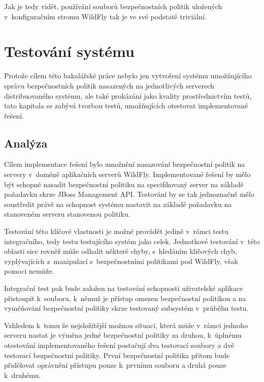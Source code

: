 Jak je tedy vidět, používání souborů bezpečnostních politik uložených v~konfiguračním stromu WildFly tak je ve své podstatě triviální.

\chapter{Testování systému} \label{testovani}

Protože cílem této bakalářské práce nebylo jen vytvoření systému umožňujícího správu bezpečnostních politik nasazených na jednotlivých serverech distribuovaného systému, ale také prokázání jako kvality prostřednictvím testů, tato kapitola se zabývá tvorbou testů, umožňujících otestovat implementované řešení.

\section{Analýza} %

Cílem implementace řešení bylo umožnění nasazování bezpečnostní politik na servery v~doméně aplikačních serverů WildFly.
Implementované řešení by mělo být schopné nasadit bezpečnostní politiku na specifikovaný server na základě požadavku skrze JBoss Management API.
Testování by se tak jednoznačně mělo soustředit právě na schopnost systému nastavit na základě požadavku na stanoveném serveru stanovenou politiku.

Testování této klíčové vlastnosti je možné provádět jedině v~rámci testu integračního, tedy testu testujícího systém jako celek.
Jednotkové testování v~této oblasti sice rovněž může odhalit některé chyby, s~hledáním klíčových chyb, vyplývajících z~manipulací s~bezpečnostními politikami pod WildFly, však pomoci nemůže.

Integrační test pak bude založen na testování schopnosti uživatelské aplikace přistoupit k~souboru, k~němuž je přístup omezen bezpečnostní politikou a na vyměňování bezpečnostní politiky skrze testovaný subsystém v~průběhu testu.

Vzhledem k~tomu že nejsložitější možnou situací, která může v~rámci jednoho serveru nastat je výměna jedné bezpečnostní politiky za druhou,
k~úplnému otestování implementovaného řešení postačují dva testovací soubory a dvě testovací bezpečnostní politiky.
První bezpečnostní politika přitom bude přidělovat oprávnění přístupu pouze k~prvnímu souboru a druhá pouze k~druhému.

